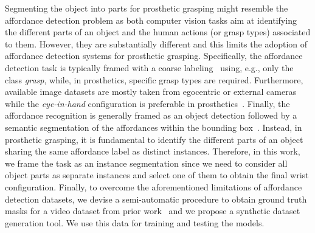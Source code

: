  Segmenting the object into parts for prosthetic grasping might resemble the affordance detection problem as both computer vision tasks aim at identifying the different parts of an object and the human actions (or grasp types) associated to them. However, they are substantially different and this limits the adoption of affordance detection systems for prosthetic grasping. Specifically, the affordance detection task is typically framed with a coarse labeling~\cite{nguyen2017,myers2015} using, e.g., only the class \textit{grasp}, while, in prosthetics, specific grasp types are required. Furthermore, available image datasets are mostly taken from egocentric or external cameras while the \textit{eye-in-hand} configuration is preferable in prosthetics~\cite{vasile2022}. Finally, the affordance recognition is generally framed as an object detection followed by a semantic segmentation of the affordances within the bounding box~\cite{do2018affordancenet}. 
Instead, in prosthetic grasping, it is fundamental to identify the different parts of an object sharing the same affordance label as distinct instances.
Therefore, in this work, we frame the task as an instance segmentation since we need to consider all object parts as separate instances and select one of them to obtain the final wrist configuration. Finally, to overcome the aforementioned limitations of affordance detection datasets, we devise a semi-automatic procedure to obtain ground truth masks for a video dataset from prior work~\cite{vasile2022} and we propose a synthetic dataset generation tool. We use this data for training and testing the models.




